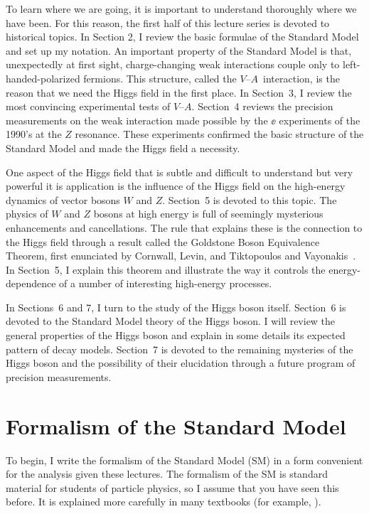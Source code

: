 \documentclass[12pt]{article}
\def\VmA{ $V$--$A$}
\begin{document}
To learn where we are going, it is important to understand thoroughly
where we have been.  For this reason, the first half of this lecture
series is 
devoted to historical topics. In Section 2, I  review the basic
formulae of the Standard Model and set up my notation. An important
property of the Standard Model is that, unexpectedly at first sight, 
charge-changing weak interactions couple only to left-handed-polarized
fermions.  This structure, called the \VmA\ interaction, is the reason
that we need the Higgs field in the first place.   In 
Section~3, I  review the most convincing experimental tests of \VmA.
Section~4 reviews the precision measurements on the weak
interaction made possible by the $\ee$ experiments of the 1990's at
the $Z$ resonance.  These experiments confirmed the basic structure
of the Standard Model and made the Higgs field a necessity.

One aspect of the Higgs field that is subtle and difficult to
understand but very powerful it is application is the influence of 
the Higgs field on  the high-energy dynamics of vector bosons $W$ and
$Z$.   Section~5 is devoted to this topic.   The physics of $W$ and
$Z$ bosons at high energy is full of seemingly mysterious enhancements
and cancellations.  The rule that explains these is the connection to
the Higgs field through a result called the Goldstone Boson
Equivalence Theorem, first enunciated by Cornwall, Levin, and Tiktopoulos and
Vayonakis~\cite{Cornwall,Vayonakis}.    In Section~5, I explain this
theorem and illustrate the way it controls the energy-dependence of a 
number of interesting high-energy processes.

In Sections~6 and 7, I turn to the study of the Higgs boson itself.
Section~6 is devoted to the Standard Model theory of the Higgs boson.
I will review the general properties of the Higgs boson and explain in
some details its expected pattern of decay models.  Section~7 is
devoted to the remaining mysteries of the Higgs boson and the
possibility of their elucidation through a future program of precision
measurements.   

\section{Formalism of the Standard Model}

To begin, I write the formalism of the Standard Model (SM) in a form convenient
for the analysis given these lectures.   The formalism of the SM is 
standard material for students of 
particle physics, so I assume that you have seen this before.  It
is explained more carefully in many textbooks (for 
example, \cite{PeskinSchr,Schw}).
\end{document}
